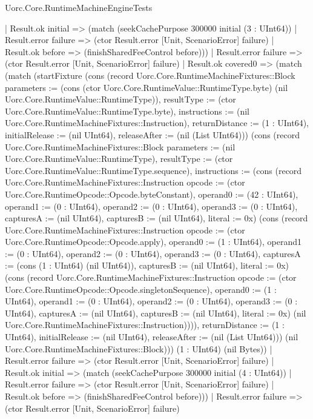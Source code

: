 \begin{lexlean}{Uorc.Core.RuntimeMachineEngineTests}
\begin{semanticmodule}
{      | Result.ok initial => (match (seekCachePurpose 300000 initial (3 : UInt64))
        | Result.error failure => (ctor Result.error [Unit, ScenarioError] failure)
        | Result.ok before => (finishSharedFeeControl before)))
    | Result.error failure => (ctor Result.error [Unit, ScenarioError] failure)
    | Result.ok covered0 => (match (match (startFixture (cons (record Uorc.Core.RuntimeMachineFixtures::Block {parameters := (cons (ctor Uorc.Core.RuntimeValue::RuntimeType.byte) (nil Uorc.Core.RuntimeValue::RuntimeType)), resultType := (ctor Uorc.Core.RuntimeValue::RuntimeType.byte), instructions := (nil Uorc.Core.RuntimeMachineFixtures::Instruction), returnDistance := (1 : UInt64), initialRelease := (nil UInt64), releaseAfter := (nil (List UInt64))}) (cons (record Uorc.Core.RuntimeMachineFixtures::Block {parameters := (nil Uorc.Core.RuntimeValue::RuntimeType), resultType := (ctor Uorc.Core.RuntimeValue::RuntimeType.sequence), instructions := (cons (record Uorc.Core.RuntimeMachineFixtures::Instruction {opcode := (ctor Uorc.Core.RuntimeOpcode::Opcode.byteConstant), operand0 := (42 : UInt64), operand1 := (0 : UInt64), operand2 := (0 : UInt64), operand3 := (0 : UInt64), capturesA := (nil UInt64), capturesB := (nil UInt64), literal := 0x}) (cons (record Uorc.Core.RuntimeMachineFixtures::Instruction {opcode := (ctor Uorc.Core.RuntimeOpcode::Opcode.apply), operand0 := (1 : UInt64), operand1 := (0 : UInt64), operand2 := (0 : UInt64), operand3 := (0 : UInt64), capturesA := (cons (1 : UInt64) (nil UInt64)), capturesB := (nil UInt64), literal := 0x}) (cons (record Uorc.Core.RuntimeMachineFixtures::Instruction {opcode := (ctor Uorc.Core.RuntimeOpcode::Opcode.singletonSequence), operand0 := (1 : UInt64), operand1 := (0 : UInt64), operand2 := (0 : UInt64), operand3 := (0 : UInt64), capturesA := (nil UInt64), capturesB := (nil UInt64), literal := 0x}) (nil Uorc.Core.RuntimeMachineFixtures::Instruction)))), returnDistance := (1 : UInt64), initialRelease := (nil UInt64), releaseAfter := (nil (List UInt64))}) (nil Uorc.Core.RuntimeMachineFixtures::Block))) (1 : UInt64) (nil Bytes))
        | Result.error failure => (ctor Result.error [Unit, ScenarioError] failure)
        | Result.ok initial => (match (seekCachePurpose 300000 initial (4 : UInt64))
          | Result.error failure => (ctor Result.error [Unit, ScenarioError] failure)
          | Result.ok before => (finishSharedFeeControl before)))
      | Result.error failure => (ctor Result.error [Unit, ScenarioError] failure)
}
\end{semanticmodule}
\end{lexlean}
